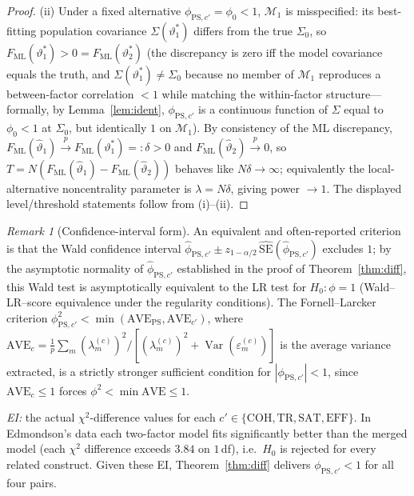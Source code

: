 \documentclass{amsart}
\theoremstyle{remark}
\newtheorem{remark}{Remark}
\begin{document}
\begin{proof}
(ii) Under a fixed alternative $\phi_{\mathrm{PS},c'}=\phi_0<1$, $\mathcal M_1$ is
misspecified: its best-fitting population covariance $\Sigma(\vartheta_1^\ast)$
differs from the true $\Sigma_0$, so $F_{\mathrm{ML}}(\vartheta_1^\ast)>0
=F_{\mathrm{ML}}(\vartheta_2^\ast)$ (the discrepancy is zero iff the model
covariance equals the truth, and $\Sigma(\vartheta_1^\ast)\neq\Sigma_0$ because no
member of $\mathcal M_1$ reproduces a between-factor correlation $<1$ while
matching the within-factor structure---formally, by Lemma~\ref{lem:ident},
$\phi_{\mathrm{PS},c'}$ is a continuous function of $\Sigma$ equal to $\phi_0<1$ at
$\Sigma_0$, but identically $1$ on $\mathcal M_1$). By consistency of the ML
discrepancy, $F_{\mathrm{ML}}(\hat\vartheta_1)\xrightarrow{p}F_{\mathrm{ML}}(\vartheta_1^\ast)=:\delta>0$
and $F_{\mathrm{ML}}(\hat\vartheta_2)\xrightarrow{p}0$, so
$T=N(F_{\mathrm{ML}}(\hat\vartheta_1)-F_{\mathrm{ML}}(\hat\vartheta_2))$ behaves like
$N\delta\to\infty$; equivalently the local-alternative noncentrality parameter is
$\lambda=N\delta$, giving power $\to1$. The displayed level/threshold statements
follow from (i)--(ii). \end{proof}

\begin{remark}[Confidence-interval form]
An equivalent and often-reported criterion is that the Wald confidence interval
$\hat\phi_{\mathrm{PS},c'}\pm z_{1-\alpha/2}\,\widehat{\mathrm{SE}}(\hat\phi_{\mathrm{PS},c'})$
excludes $1$; by the asymptotic normality of $\hat\phi_{\mathrm{PS},c'}$ established
in the proof of Theorem~\ref{thm:diff}, this Wald test is asymptotically equivalent
to the LR test for $H_0:\phi=1$ (Wald--LR--score equivalence under the regularity
conditions). The Fornell--Larcker criterion
$\phi_{\mathrm{PS},c'}^2<\min(\mathrm{AVE}_{\mathrm{PS}},\mathrm{AVE}_{c'})$, where
$\mathrm{AVE}_c=\frac1p\sum_m(\lambda^{(c)}_m)^2/[(\lambda^{(c)}_m)^2+\operatorname{Var}(\varepsilon^{(c)}_m)]$
is the average variance extracted, is a strictly stronger sufficient condition for
$|\phi_{\mathrm{PS},c'}|<1$, since $\mathrm{AVE}_c\le1$ forces
$\phi^2<\min\mathrm{AVE}\le1$.
\end{remark}

\emph{EI:} the actual $\chi^2$-difference values for each $c'\in\{\mathrm{COH,TR,SAT,EFF}\}$.
In Edmondson's data each two-factor model fits significantly better than the merged
model (each $\chi^2$ difference exceeds $3.84$ on $1\,$df), i.e.\ $H_0$ is rejected
for every related construct. Given these EI, Theorem~\ref{thm:diff} delivers
$\phi_{\mathrm{PS},c'}<1$ for all four pairs.
\end{document}
